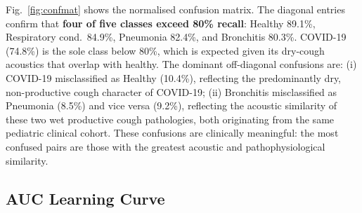 \documentclass[10pt,journal,compsoc]{IEEEtran}
\begin{document}
Fig.~\ref{fig:confmat} shows the normalised confusion matrix.
The diagonal entries confirm that \textbf{four of five classes exceed 80\%
recall}: Healthy 89.1\%, Respiratory cond.\ 84.9\%, Pneumonia 82.4\%,
and Bronchitis 80.3\%. COVID-19 (74.8\%) is the sole class below 80\%,
which is expected given its dry-cough acoustics that overlap with healthy.
The dominant off-diagonal confusions are:
(i) COVID-19 misclassified as Healthy (10.4\%), reflecting the
predominantly dry, non-productive cough character of COVID-19;
(ii) Bronchitis misclassified as Pneumonia (8.5\%) and vice versa (9.2\%),
reflecting the acoustic similarity of these two wet productive
cough pathologies, both originating from the same pediatric clinical cohort.
These confusions are clinically meaningful: the most confused pairs are
those with the greatest acoustic and pathophysiological similarity.

\subsection{AUC Learning Curve}
\end{document}
